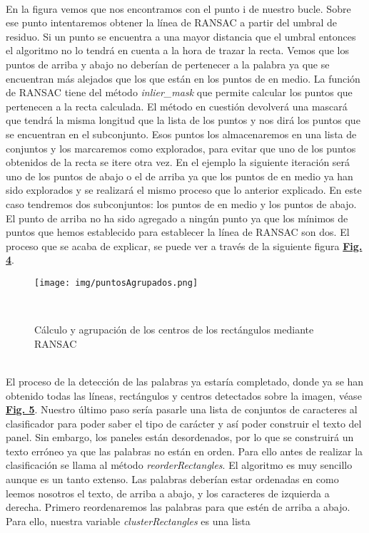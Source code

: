 \documentclass[a4paper, 12pt]{article}
\begin{document}
\\ En la figura vemos que nos encontramos con el punto i de nuestro bucle. Sobre ese punto intentaremos obtener la línea de RANSAC a partir del umbral de residuo. Si un punto se encuentra a una mayor distancia que el umbral entonces el algoritmo no lo tendrá en cuenta a la hora de trazar la recta. Vemos que los puntos de arriba y abajo no deberían de pertenecer a la palabra ya que se encuentran más alejados que los que están en los puntos de en medio. La función de RANSAC tiene del método \textit{inlier\_mask} que permite calcular los puntos que pertenecen a la recta calculada. El método en cuestión devolverá una mascará que tendrá la misma longitud que la lista de los puntos y nos dirá  los puntos que se encuentran en el subconjunto. Esos puntos los almacenaremos en una lista de conjuntos y los marcaremos como explorados, para evitar que uno de los puntos obtenidos de la recta se itere otra vez. En el ejemplo la siguiente iteración será uno de los puntos de abajo o el de arriba ya que los puntos de en medio ya han sido explorados y se realizará el mismo proceso que lo anterior explicado. En este caso tendremos dos subconjuntos: los puntos de en medio y los puntos de abajo. El punto de arriba no ha sido agregado a ningún punto ya que los mínimos de puntos que hemos establecido para establecer la línea de RANSAC son dos. El proceso que se acaba de explicar, se puede ver a través de la siguiente figura \textbf{\hyperref[fig:puntosAgrupados]{Fig. 4}}.
\begin{figure}[h]
	\centering
	\texttt{[image: img/puntosAgrupados.png]}
 	\caption{Cálculo y agrupación de los centros de los rectángulos mediante RANSAC}\
	\label{fig:puntosAgrupados}
\end{figure}
\\El proceso de la detección de las palabras ya estaría completado, donde ya se han obtenido todas las líneas, rectángulos y centros detectados sobre la imagen, véase \textbf{\hyperref[fig:imagenDetectada]{Fig. 5}}. Nuestro último paso sería pasarle una lista de conjuntos de caracteres al clasificador para poder saber el tipo de carácter y así poder construir el texto del panel. Sin embargo, los paneles están desordenados, por lo que se construirá un texto erróneo ya que las palabras no están en orden. Para ello antes de realizar la clasificación se llama al método \textit{reorderRectangles}. El algoritmo es muy sencillo aunque es un tanto extenso. Las palabras deberían estar ordenadas en como leemos nosotros el texto, de arriba a abajo, y los caracteres de izquierda a derecha. Primero reordenaremos las palabras para que estén de arriba a abajo. Para ello, nuestra variable \textit{clusterRectangles} es una lista 
\end{document}

